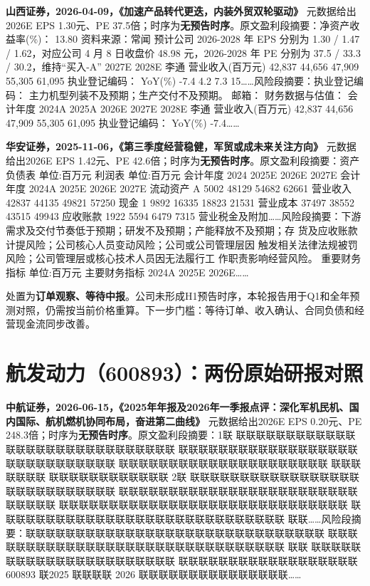\textbf{山西证券，2026-04-09，《加速产品转代更迭，内装外贸双轮驱动》}
元数据给出2026E EPS 1.30元、PE 37.5倍；时序为\textbf{无预告时序}。原文盈利段摘要：净资产收益率(\%)： 13.80 资料来源：常闻 预计公司 2026-2028 年 EPS 分别为 1.30 / 1.47 / 1.62，对应公司 4 月 8 日收盘价 48.98 元，2026-2028 年 PE 分别为 37.5 / 33.3 / 30.2，维持“买入-A” 2027E 2028E 李通 营业收入(百万元) 42,837 44,656 47,909 55,305 61,095 执业登记编码： YoY(\%) -7.4 4.2 7.3 15……风险段摘要：执业登记编码： 主力机型列装不及预期；生产交付不及预期。 邮箱： 财务数据与估值： 会计年度 2024A 2025A 2026E 2027E 2028E 李通 营业收入(百万元) 42,837 44,656 47,909 55,305 61,095 执业登记编码： YoY(\%) -7.4……

\textbf{华安证券，2025-11-06，《第三季度经营稳健，军贸或成未来关注方向》}
元数据给出2026E EPS 1.42元、PE 42.6倍；时序为\textbf{无预告时序}。原文盈利段摘要：资产负债表 单位:百万元 利润表 单位:百万元 会计年度 2024 2025E 2026E 2027E 会计年度 2024A 2025E 2026E 2027E 流动资产 A 5002 48129 54682 62661 营业收入 42837 44135 49821 57250 现金 1 9892 16335 18823 21531 营业成本 37497 38552 43515 49943 应收账款 1922 5594 6479 7315 营业税金及附加……风险段摘要：下游需求及交付节奏低于预期；研发不及预期；产能释放不及预期；存 货及应收账款计提风险；公司核心人员变动风险；公司或公司管理层因 触发相关法律法规被罚风险；公司管理层或核心技术人员因无法履行工 作职责影响经营风险。 重要财务指标 单位:百万元 主要财务指标 2024A 2025E 2026E……

\begin{keyinsight}[AStock处理]
处置为\textbf{订单观察、等待中报}。公司未形成H1预告时序，本轮报告用于Q1和全年预测对照，仍需按当前价格重算。下一步门槛：等待订单、收入确认、合同负债和经营现金流同步改善。
\end{keyinsight}

\section{航发动力（600893）：两份原始研报对照}

\textbf{中航证券，2026-06-15，《2025年年报及2026年一季报点评：深化军机民机、国内国际、航机燃机协同布局，奋进第二曲线》}
元数据给出2026E EPS 0.20元、PE 248.3倍；时序为\textbf{无预告时序}。原文盈利段摘要：1联 联联联联联联联联联联联联联联联联联联联联联联联联联联联联联 联联联联联联联联联联联联联联联联联联联联联联联联联联联联联 联联联联联联联联联联联联联联联联联联联联联 联联联联联联联 联联联联联联联联联联联联 2联 联联联联联联联联联联联联联联联联联联联联联联联联联联联联 联联联联联联联联联联联联联联联联联联联联联联联联联联联联联 联联联联联联联联联联联联联联联联联联联联联联联联联联联联联 联联联联联联联联联联联联联联联联联联联联联联联联联联联联联 联联……风险段摘要：联联联联联联联联联联联联联联联联联联联联联联联联联联联联联联 联联联联联联联联联联联联联联联联联联联联联联联联联联联联联联联 联联 联联联联联联联联联联联联联联联联联联联联联联 联联联联联联联联联联联联联联联联联联600893 联2025 联联联联 2026 联联联联联联联联联联联联联联联……

